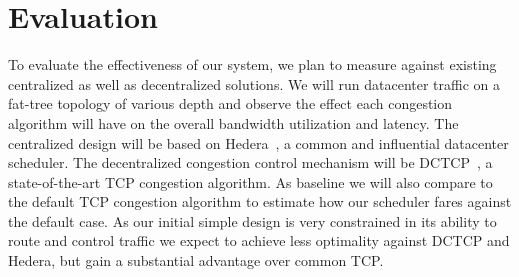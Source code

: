 \section{Evaluation}
\label{sec:evaluation}
To evaluate the effectiveness of our system, we plan to measure against existing centralized as well as decentralized solutions. We will run datacenter traffic on a fat-tree topology of various depth and observe the effect each congestion algorithm will have on the overall bandwidth utilization and latency.
The centralized design will be based on Hedera~\cite{hedera}, a common and influential datacenter scheduler.
The decentralized congestion control mechanism will be DCTCP~\cite{dctcp}, a state-of-the-art TCP congestion algorithm. As baseline we will also compare to the default TCP congestion algorithm to estimate how our scheduler fares against the default case. As our initial simple design is very constrained in its ability to route and control traffic we expect to achieve less optimality against DCTCP and Hedera, but gain a substantial advantage over common TCP.
